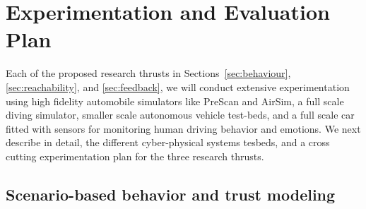 
\section{Experimentation and Evaluation Plan}
\label{sec:experiment}





Each of the proposed research thrusts in Sections~\ref{sec:behaviour},\ref{sec:reachability}, and \ref{sec:feedback}, we will conduct extensive experimentation using high fidelity automobile simulators like PreScan and AirSim, a full scale diving simulator, smaller scale autonomous vehicle test-beds, and a full scale car fitted with sensors for monitoring human driving behavior and emotions. We next describe in detail, the different cyber-physical systems tesbeds, and a cross cutting experimentation plan for the three research thrusts. 


\subsection{Scenario-based behavior and trust modeling}
\label{subsec:trust-modeling}



